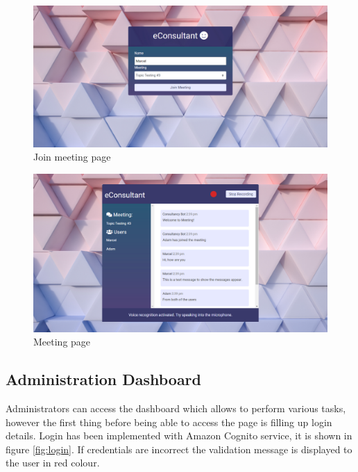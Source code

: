 \documentclass{article}
\begin{document}
\begin{figure}[H]
  \centering
  \includegraphics[scale=0.29]{implementation/joinMeeting.jpg}
  \caption{Join meeting page}
  \label{fig:joinMeetingPage}
\end{figure}

\begin{figure}[H]
  \centering
  \includegraphics[scale=0.29]{implementation/meeting.jpg}
  \caption{Meeting page}
  \label{fig:meetingPage}
\end{figure}

\subsection{Administration Dashboard}
{\large 
Administrators can access the dashboard which allows to perform various tasks, however the first thing before being able to access the page is filling up login details. Login has been implemented with Amazon Cognito service, it is shown in figure \ref{fig:login}. If credentials are incorrect the validation message is displayed to the user in red colour. \par
}

\vspace{15pt}
\end{document}
